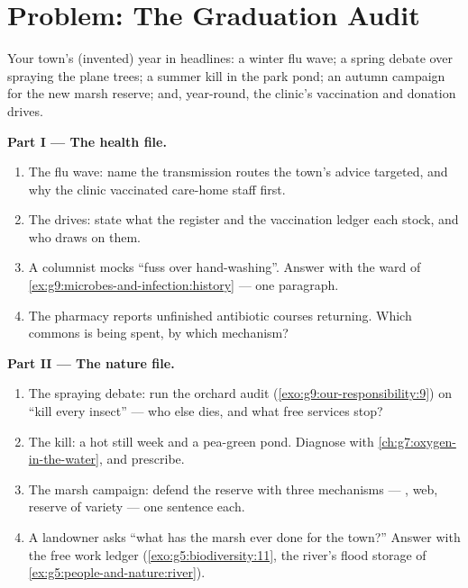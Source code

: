 \section{Problem: The Graduation Audit}

\begin{problem}\label{pb:g9:our-responsibility:1}
Your town's (invented) year in headlines: a winter flu
wave; a spring debate over spraying the plane trees; a
summer  kill in the park pond; an autumn campaign
for the new marsh reserve; and, year-round, the
clinic's vaccination and donation drives.

\medskip\noindent\textbf{Part I --- The health file.}
\begin{enumerate}
  \item The flu wave: name the transmission routes the
        town's advice targeted, and why the clinic
        vaccinated care-home staff first.
  \item The drives: state what the  register and
        the vaccination ledger each stock, and who
        draws on them.
  \item A columnist mocks ``fuss over hand-washing''.
        Answer with the ward of
        \cref{ex:g9:microbes-and-infection:history} ---
        one paragraph.
  \item The pharmacy reports unfinished antibiotic
        courses returning. Which commons is being
        spent, by which mechanism?
\end{enumerate}

\medskip\noindent\textbf{Part II --- The nature file.}
\begin{enumerate}[resume]
  \item The spraying debate: run the orchard audit
        (\cref{exo:g9:our-responsibility:9}) on
        ``kill every insect'' --- who else dies, and
        what free services stop?
  \item The  kill: a hot still week and a
        pea-green pond. Diagnose with
        \cref{ch:g7:oxygen-in-the-water}, and
        prescribe.
  \item The marsh campaign: defend the reserve with
        three mechanisms --- , web, reserve of
        variety --- one sentence each.
  \item A landowner asks ``what has the marsh ever
        done for the town?'' Answer with the free work
        ledger (\cref{exo:g5:biodiversity:11}, the
        river's flood storage of
        \cref{ex:g5:people-and-nature:river}).
\end{enumerate}


\end{problem}
